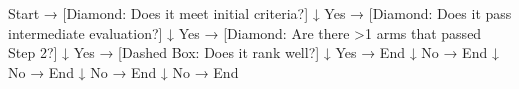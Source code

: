 Start → [Diamond: Does it meet initial criteria?]  
      ↓ Yes → [Diamond: Does it pass intermediate evaluation?]  
            ↓ Yes → [Diamond: Are there >1 arms that passed Step 2?]  
                  ↓ Yes → [Dashed Box: Does it rank well?]  
                        ↓ Yes → End  
                        ↓ No → End  
                  ↓ No → End  
            ↓ No → End  
      ↓ No → End